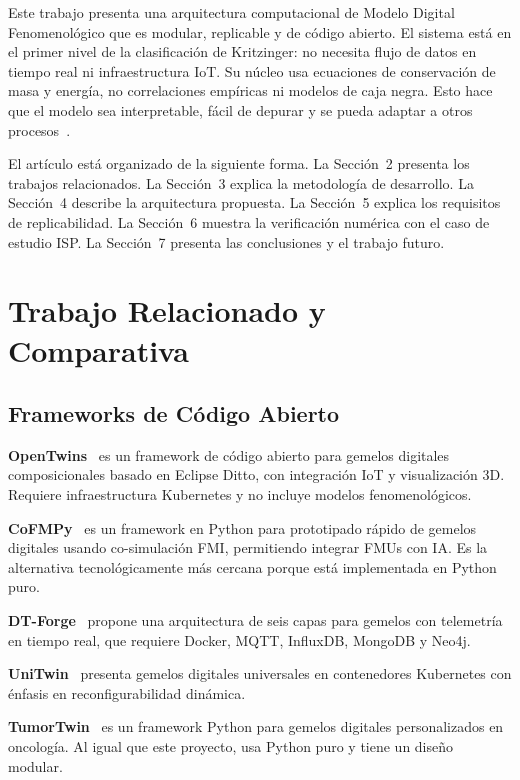 \documentclass[10pt,letterpaper]{article}
\begin{document}
Este trabajo presenta una arquitectura computacional de Modelo Digital Fenomenol\'ogico que es modular, replicable y de c\'odigo abierto. El sistema est\'a en el primer nivel de la clasificaci\'on de Kritzinger: no necesita flujo de datos en tiempo real ni infraestructura IoT. Su n\'ucleo usa ecuaciones de conservaci\'on de masa y energ\'ia, no correlaciones emp\'iricas ni modelos de caja negra. Esto hace que el modelo sea interpretable, f\'acil de depurar y se pueda adaptar a otros procesos~\cite{perry2019}.

El art\'iculo est\'a organizado de la siguiente forma. La Secci\'on~2 presenta los trabajos relacionados. La Secci\'on~3 explica la metodolog\'ia de desarrollo. La Secci\'on~4 describe la arquitectura propuesta. La Secci\'on~5 explica los requisitos de replicabilidad. La Secci\'on~6 muestra la verificaci\'on num\'erica con el caso de estudio ISP. La Secci\'on~7 presenta las conclusiones y el trabajo futuro.

\section{Trabajo Relacionado y Comparativa}

\subsection{Frameworks de C\'odigo Abierto}

\textbf{OpenTwins}~\cite{robles2023opentwins} es un framework de c\'odigo abierto para gemelos digitales composicionales basado en Eclipse Ditto, con integraci\'on IoT y visualizaci\'on 3D. Requiere infraestructura Kubernetes y no incluye modelos fenomenol\'ogicos.

\textbf{CoFMPy}~\cite{friedrich2025cofmupy} es un framework en Python para prototipado r\'apido de gemelos digitales usando co-simulaci\'on FMI, permitiendo integrar FMUs con IA. Es la alternativa tecnol\'ogicamente m\'as cercana porque est\'a implementada en Python puro.

\textbf{DT-Forge}~\cite{dtforge2025} propone una arquitectura de seis capas para gemelos con telemetr\'ia en tiempo real, que requiere Docker, MQTT, InfluxDB, MongoDB y Neo4j.

\textbf{UniTwin}~\cite{haussermann2024unitwin} presenta gemelos digitales universales en contenedores Kubernetes con \'enfasis en reconfigurabilidad din\'amica.

\textbf{TumorTwin}~\cite{tumortwin2025} es un framework Python para gemelos digitales personalizados en oncolog\'ia. Al igual que este proyecto, usa Python puro y tiene un dise\~no modular.
\end{document}
